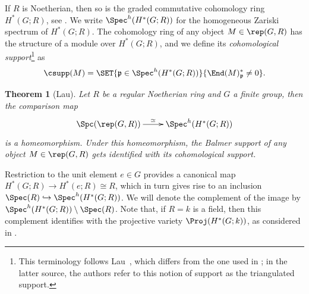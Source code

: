 \documentclass{amsart}%
\numberwithin{equation}{section}%
\newtheorem{Thm}[equation]{Theorem}
\theoremstyle{remark}
\begin{document}
If $R$ is Noetherian, then so is the graded commutative cohomology ring $H^*(G;R)$, see \cite{evens,golod,venkov}. We write $\Spec^h(H^*(G;R))$ for the homogeneous Zariski spectrum of $H^*(G;R)$. The cohomology ring of any object $M \in \rep(G,R)$ has the structure of a module over $H^*(G;R)$, and we define its \emph{cohomological support}\footnote{This terminology follows Lau~\cite{lau_spcdmstacks}, which differs from the one used in \cite{BensonIyengarKrause08}; in the latter source, the authors refer to this notion of support as the triangulated support.} as
\[
\csupp(M) = \SET{\frak p \in \Spec^h(H^*(G;R))}{\End(M)^*_{\frak p} \neq 0}.
\]

\begin{Thm}[Lau]\label{thm:lau}
Let $R$ be a regular Noetherian ring and $G$ a finite group, then the comparison map  
\begin{equation}\label{eq:laucomparisonmap}
\xymatrix{\Spc(\rep(G,R)) \ar[r]^-{\simeq} & \Spec^h(H^*(G;R))}
\end{equation}
is a homeomorphism. Under this homeomorphism, the Balmer support of any object $M \in \rep(G,R)$ gets identified with its cohomological support.
\end{Thm}

Restriction to the unit element $e \in G$ provides a canonical map $H^*(G;R) \to H^*(e;R) \cong R$, which in turn gives rise to an inclusion $\Spec(R) \hookrightarrow \Spec^h(H^*(G;R))$. We will denote the complement of the image by $\Spec^h(H^*(G;R))\setminus\Spec(R)$. Note that, if $R = k$ is a field, then this complement identifies with the projective variety $\Proj(H^*(G;k))$, as considered in \cite{BensonIyengarKrause11a}.
\end{document}

